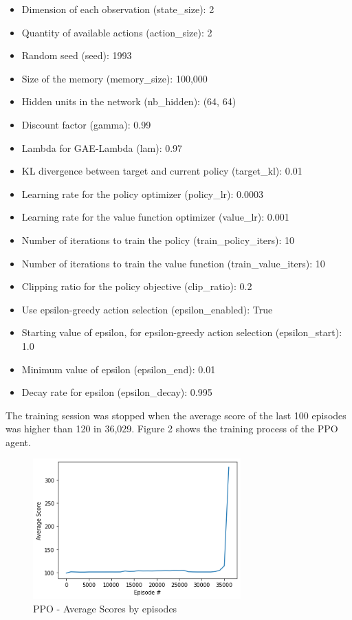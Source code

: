 \documentclass[letterpaper]{article}
\begin{document}
\begin{itemize}
    \item Dimension of each observation (state\_size): 2
    \item Quantity of available actions (action\_size): 2
    \item Random seed (seed): 1993
    \item Size of the memory (memory\_size): 100,000
    \item Hidden units in the network (nb\_hidden): (64, 64)
    \item Discount factor (gamma): 0.99
    \item Lambda for GAE-Lambda (lam): 0.97
    \item KL divergence between target and current policy (target\_kl): 0.01
    \item Learning rate for the policy optimizer (policy\_lr): 0.0003
    \item Learning rate for the value function optimizer (value\_lr): 0.001
    \item Number of iterations to train the policy (train\_policy\_iters): 10
    \item Number of iterations to train the value function (train\_value\_iters): 10
    \item Clipping ratio for the policy objective (clip\_ratio): 0.2
    \item Use epsilon-greedy action selection (epsilon\_enabled): True
    \item Starting value of epsilon, for epsilon-greedy action selection (epsilon\_start): 1.0
    \item Minimum value of epsilon (epsilon\_end): 0.01
    \item Decay rate for epsilon (epsilon\_decay): 0.995
\end{itemize}

The training session was stopped when the average score of the last 100 episodes was higher than 120 in 36,029. Figure 2 shows the training process of the PPO agent. 

\begin{figure}[ht]
    \centering
    \includegraphics[width=8cm]{images/PPO_score.png}
    \caption{PPO - Average Scores by episodes}
    \label{fig:PPO-avg-scores}
\end{figure}
\end{document}
